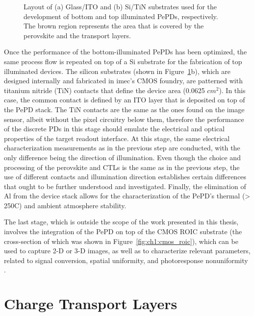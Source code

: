 \begin{figure}[htbp]
    \caption{Layout of (a) Glass/ITO and (b) Si/TiN substrates used for the development of bottom and top illuminated PePDs, respectively. The brown region represents the area that is covered by the perovskite and the transport layers.}
    \label{fig:ch2:types_of_substrates}
\end{figure}


Once the performance of the bottom-illuminated PePDs has been optimized, the same process flow is repeated on top of a Si substrate for the fabrication of top illuminated devices. The silicon substrates (shown in Figure~\ref{fig:ch2:types_of_substrates}b), which are designed internally and fabricated in imec's CMOS foundry, are patterned with titanium nitride (TiN) contacts that define the device area (0.0625 $cm^2$). In this case, the common contact is defined by an ITO layer that is deposited on top of the PePD stack. The TiN contacts are the same as the ones found on the image sensor, albeit without the pixel circuitry below them, therefore the performance of the discrete PDs in this stage should emulate the electrical and optical properties of the target readout interface. At this stage, the same electrical characterization measurements as in the previous step are conducted, with the only difference being the direction of illumination. Even though the choice and processing of the perovskite and CTLs is the same as in the previous step, the use of different contacts and illumination direction establishes certain differences that ought to be further understood and investigated. Finally, the elimination of Al from the device stack allows for the characterization of the PePD's thermal (> 250\degree C) and ambient atmosphere stability. 

The last stage, which is outside the scope of the work presented in this thesis, involves the integration of the PePD on top of the CMOS ROIC substrate (the cross-section of which was shown in Figure~\ref{fig:ch1:cmos_roic}), which can be used to capture 2-D or 3-D images, as well as to characterize relevant parameters, related to signal conversion, spatial uniformity, and photoresponse nonuniformity \cite{Malinowski2023ImageAbsorbers, Song2024HalideImager}. 



\section{Charge Transport Layers}

